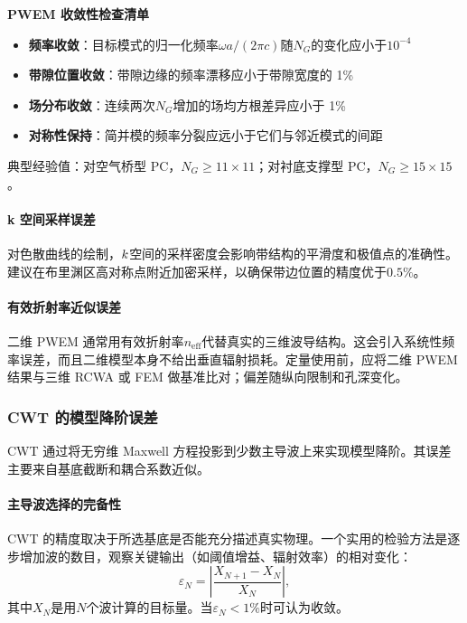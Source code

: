 \begin{NumericalErrorBox}
\textbf{PWEM 收敛性检查清单}
\begin{itemize}
  \item \textbf{频率收敛}：目标模式的归一化频率$\omega a/(2\pi c)$随$N_G$的变化应小于$10^{-4}$
  \item \textbf{带隙位置收敛}：带隙边缘的频率漂移应小于带隙宽度的 1\%
  \item \textbf{场分布收敛}：连续两次$N_G$增加的场均方根差异应小于 1\%
  \item \textbf{对称性保持}：简并模的频率分裂应远小于它们与邻近模式的间距
\end{itemize}
典型经验值：对空气桥型 PC，$N_G \geq 11\times 11$；对衬底支撑型 PC，$N_G \geq 15\times 15$。
\end{NumericalErrorBox}

\paragraph{k 空间采样误差}
对色散曲线的绘制，$k$空间的采样密度会影响带结构的平滑度和极值点的准确性。建议在布里渊区高对称点附近加密采样，以确保带边位置的精度优于$0.5\%$。

\paragraph{有效折射率近似误差}
二维 PWEM 通常用有效折射率$n_{\text{eff}}$代替真实的三维波导结构。这会引入系统性频率误差，而且二维模型本身不给出垂直辐射损耗。定量使用前，应将二维 PWEM 结果与三维 RCWA 或 FEM 做基准比对；偏差随纵向限制和孔深变化。

\subsubsection{CWT 的模型降阶误差}
CWT 通过将无穷维 Maxwell 方程投影到少数主导波上来实现模型降阶。其误差主要来自基底截断和耦合系数近似。

\paragraph{主导波选择的完备性}
CWT 的精度取决于所选基底是否能充分描述真实物理。一个实用的检验方法是逐步增加波的数目，观察关键输出（如阈值增益、辐射效率）的相对变化：
\begin{equation}
\varepsilon_N = \left|\frac{X_{N+1}-X_N}{X_N}\right|,
\label{eq:cwt_convergence_metric}
\end{equation}
其中$X_N$是用$N$个波计算的目标量。当$\varepsilon_N < 1\%$时可认为收敛。


